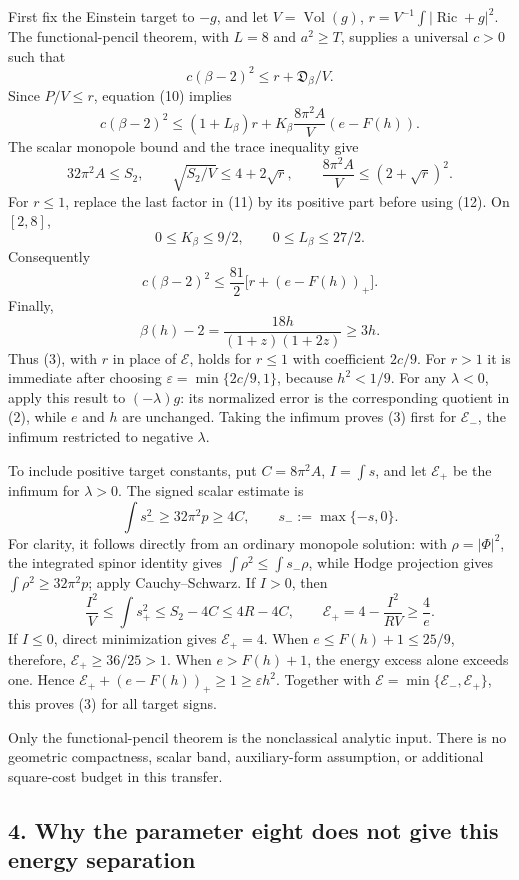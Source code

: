 \documentclass[
  11pt,
]{article}
\begin{document}
First fix the Einstein target to \(-g\), and let
\(V=\operatorname{Vol}(g)\), \(r=V^{-1}\int|\operatorname{Ric}+g|^2\).
The functional-pencil theorem, with \(L=8\) and \(a^2\ge T\), supplies a
universal \(c>0\) such that \[
 c(\beta-2)^2\le r+\mathfrak D_\beta/V.
\] Since \(P/V\le r\), equation (10) implies \[
 c(\beta-2)^2
 \le (1+L_\beta)r+
 K_\beta\frac{8\pi^2A}{V}(e-F(h)).
 \tag{11}
\] The scalar monopole bound and the trace inequality give \[
 32\pi^2A\le S_2,\qquad
 \sqrt{S_2/V}\le4+2\sqrt r,
 \qquad \frac{8\pi^2A}{V}\le(2+\sqrt r)^2.
 \tag{12}
\] For \(r\le1\), replace the last factor in (11) by its positive part
before using (12). On \([2,8]\), \[
 0\le K_\beta\le9/2,\qquad 0\le L_\beta\le27/2.
\] Consequently \[
 c(\beta-2)^2\le\frac{81}{2}\bigl[r+(e-F(h))_+\bigr].
 \tag{13}
\] Finally, \[
 \beta(h)-2
 =\frac{18h}{(1+z)(1+2z)}\ge3h.
\] Thus (3), with \(r\) in place of \(\mathcal E\), holds for \(r\le1\)
with coefficient \(2c/9\). For \(r>1\) it is immediate after choosing
\(\varepsilon=\min\{2c/9,1\}\), because \(h^2<1/9\). For any
\(\lambda<0\), apply this result to \((-\lambda)g\): its normalized
error is the corresponding quotient in (2), while \(e\) and \(h\) are
unchanged. Taking the infimum proves (3) first for \(\mathcal E_-\), the
infimum restricted to negative \(\lambda\).

To include positive target constants, put \(C=8\pi^2A\), \(I=\int s\),
and let \(\mathcal E_+\) be the infimum for \(\lambda>0\). The signed
scalar estimate is \[
 \int s_-^2\ge32\pi^2p\ge4C,\qquad s_-:=\max\{-s,0\}.
 \tag{14}
\] For clarity, it follows directly from an ordinary monopole solution:
with \(\rho=|\Phi|^2\), the integrated spinor identity gives
\(\int\rho^2\le\int s_-\rho\), while Hodge projection gives
\(\int\rho^2\ge32\pi^2p\); apply Cauchy--Schwarz. If \(I>0\), then \[
 \frac{I^2}{V}\le\int s_+^2\le S_2-4C\le4R-4C,
 \qquad \mathcal E_+=4-\frac{I^2}{RV}\ge\frac4e.
\] If \(I\le0\), direct minimization gives \(\mathcal E_+=4\). When
\(e\le F(h)+1\le25/9\), therefore, \(\mathcal E_+\ge36/25>1\). When
\(e>F(h)+1\), the energy excess alone exceeds one. Hence
\(\mathcal E_++(e-F(h))_+\ge1\ge\varepsilon h^2\). Together with
\(\mathcal E=\min\{\mathcal E_-,\mathcal E_+\}\), this proves (3) for
all target signs.

Only the functional-pencil theorem is the nonclassical analytic input.
There is no geometric compactness, scalar band, auxiliary-form
assumption, or additional square-cost budget in this transfer.

\hypertarget{why-the-parameter-eight-does-not-give-this-energy-separation}{%
\subsection{4. Why the parameter eight does not give this energy
separation}\label{why-the-parameter-eight-does-not-give-this-energy-separation}}
\end{document}
